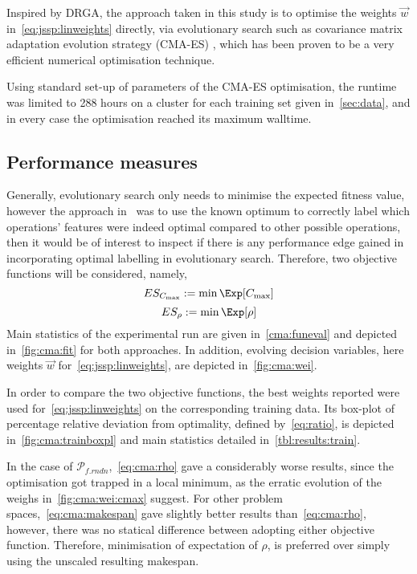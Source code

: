 \documentclass{acm_proc_article-sp}
\begin{document}
Inspired by DRGA, the approach taken in this study is to optimise the weights $\vec{w}$ in~\cref{eq:jssp:linweights} directly, via evolutionary search such as covariance matrix adaptation evolution strategy (CMA-ES) \cite{Hansen01}, which has been proven to be a very efficient numerical optimisation technique. 

Using standard set-up of parameters of the CMA-ES optimisation, the runtime was limited to 288 hours on a cluster for each training set given in~\cref{sec:data}, and in every case the optimisation reached its maximum walltime.

\subsection{Performance measures}\label{sec:expr:measure}
Generally, evolutionary search only needs to minimise the expected fitness value, however the  approach in~\cite{InRu11a} was to use the known optimum to correctly label which operations' features were indeed optimal compared to other possible operations, then it would be of interest to inspect if there is any performance edge gained in incorporating optimal labelling in evolutionary search. Therefore, two objective functions will be considered, namely, 
\begin{equation}
ES_{C_{\max}} := \min \Exp[C_{\max}] \label{eq:cma:makespan}
\end{equation}
\begin{equation}
ES_{\rho} := \min \Exp[\rho] \label{eq:cma:rho}
\end{equation} 
Main statistics of the experimental run are given in~\cref{cma:funeval} and depicted in~\cref{fig:cma:fit} for both approaches. In addition, evolving decision variables, here weights $\vec{w}$ for~\cref{eq:jssp:linweights}, are depicted in~\cref{fig:cma:wei}. 

In order to compare the two objective functions, the best weights reported were used for~\cref{eq:jssp:linweights} on the corresponding training data. Its box-plot of percentage relative deviation from optimality, defined by~\cref{eq:ratio}, is depicted in~\cref{fig:cma:trainboxpl} and main statistics detailed in~\cref{tbl:results:train}. 

In the case of $\mathcal{P}_{f.rndn}$,~\cref{eq:cma:rho}  gave a considerably worse results, since the optimisation got trapped in a local minimum, as the erratic evolution of the weighs in~\cref{fig:cma:wei:cmax} suggest.
For other problem spaces,~\cref{eq:cma:makespan} gave slightly better results than~\cref{eq:cma:rho}, however, there was no statical difference between adopting either objective function. Therefore, minimisation of expectation of $\rho$, is preferred over simply using the unscaled resulting makespan. 
\end{document}
